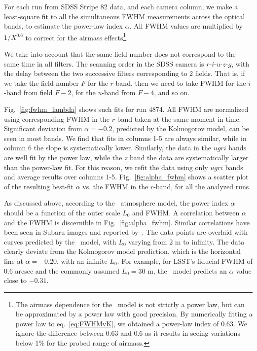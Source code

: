  
For each run from SDSS Stripe 82 data, and each camera column, we make
a least-square fit to all the simultaneous FWHM measurements across the optical bands, to
estimate the power-law index $\alpha$. All FWHM values are multiplied by $1/X^{0.6}$ to 
correct for the airmass effects\footnote{The airmass dependence for the \vk~model 
is not strictly a power law, but can be approximated by a power law with good precision.
By numerically fitting a power law to eq.~\ref{eq:FWHMvK}, we obtained a power-law index 
of 0.63. We ignore the difference between 0.63 and 0.6 as it results in seeing variations 
below 1\% for the probed range of airmass.}.

We take into account that the same field number does not correspond to the same
time in all filters. The scanning order in the SDSS camera is $r$-$i$-$u$-$z$-$g$, with the delay between the two 
successive filters corresponding to 2 fields. That is, if we take the field number $F$ for the $r$-band, then
we need to take FWHM for the $i$-band from field $F-2$, for the $u$-band
from $F-4$, and so on. 

Fig.~\ref{fig:fwhm_lambda} shows such fits for run 4874. All FWHM are normalized using 
corresponding FWHM in the $r$-band taken at the same moment in time. Significant deviation 
from $\alpha = -0.2$, predicted by the Kolmogorov model, can be seen in most bands.
We find that fits in columns 1-5 are always similar, while in column 6 the slope is 
systematically lower. Similarly, the data in the $ugri$ bands are well fit by the power law, 
while the $z$ band the data are systematically larger than the power-law fit. 
For this reason, we refit the data using only $ugri$ bands and average results
over columns 1-5.  Fig.~\ref{fig:alpha_fwhm} shows a scatter plot of the resulting
best-fit $\alpha$ vs. the FWHM in the $r$-band, for all the analyzed runs.
 
As discussed above, according to the \vk~atmosphere model, the
power index $\alpha$ should be a function of the outer scale $L_0$ and 
FWHM. A correlation between $\alpha$ and the FWHM is discernible in
Fig.~\ref{fig:alpha_fwhm}. Similar correlations have been seen in Subaru images 
and reported by~\cite{subaruSeeing2016}.
The data points are overlaid with curves predicted by the 
\vk~model, with $L_0$ varying from 2 m to infinity.
The data clearly deviate from the Kolmogorov model prediction, which is
the horizontal line at $\alpha = -0.20$, with an infinite $L_0$.
For example, for LSST's fiducial FWHM of 0.6 arcsec and the commonly assumed 
$L_0 = 30$ m, the \vk~model predicts an $\alpha$ value close to $-0.31$.



